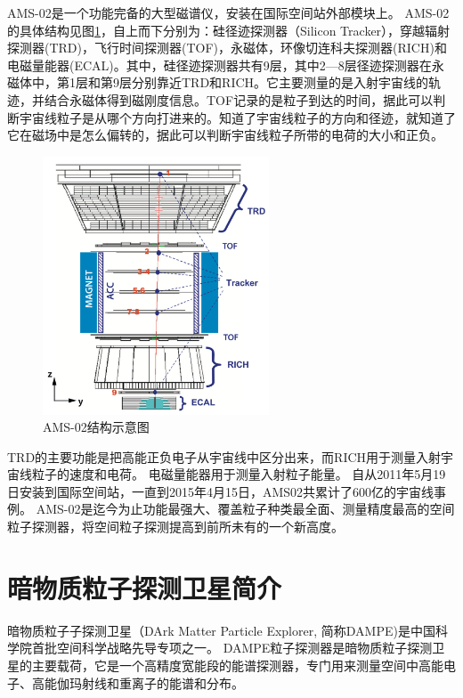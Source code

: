 AMS-02是一个功能完备的大型磁谱仪，安装在国际空间站外部模块上。
AMS-02的具体结构见图\ref{fig:introduction:ams02}，自上而下分别为：硅径迹探测器（Silicon Tracker），穿越辐射探测器(TRD)，飞行时间探测器(TOF)，永磁体，环像切连科夫探测器(RICH)和电磁量能器(ECAL)。其中，硅径迹探测器共有9层，其中2—8层径迹探测器在永磁体中，第1层和第9层分别靠近TRD和RICH。它主要测量的是入射宇宙线的轨迹，并结合永磁体得到磁刚度信息。TOF记录的是粒子到达的时间，据此可以判断宇宙线粒子是从哪个方向打进来的。知道了宇宙线粒子的方向和径迹，就知道了它在磁场中是怎么偏转的，据此可以判断宇宙线粒子所带的电荷的大小和正负。
\begin{figure}[htbp]
	\centering
	\includegraphics[width=0.6\textwidth]{chap/introduction/fig/ams022.png}
	\caption{AMS-02结构示意图}
	\label{fig:introduction:ams02}
\end{figure}
TRD的主要功能是把高能正负电子从宇宙线中区分出来，而RICH用于测量入射宇宙线粒子的速度和电荷。
电磁量能器用于测量入射粒子能量。
自从2011年5月19日安装到国际空间站，一直到2015年4月15日，AMS02共累计了600亿的宇宙线事例。
AMS-02是迄今为止功能最强大、覆盖粒子种类最全面、测量精度最高的空间粒子探测器，将空间粒子探测提高到前所未有的一个新高度。


\section{暗物质粒子探测卫星简介}
暗物质粒子子探测卫星（DArk Matter Particle Explorer, 简称DAMPE)是中国科学院首批空间科学战略先导专项之一。
DAMPE粒子探测器是暗物质粒子探测卫星的主要载荷，它是一个高精度宽能段的能谱探测器，专门用来测量空间中高能电子、高能伽玛射线和重离子的能谱和分布。

